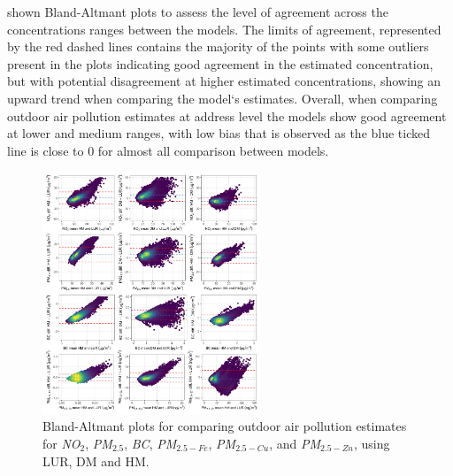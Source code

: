 \documentclass{article}
\begin{document}
\newpage

\vspace{-1em}

\textbf{} shown Bland-Altmant plots to assess the level of agreement across the concentrations ranges between the models. The limits of agreement, represented by the red dashed lines  contains the majority of the points with some outliers present in the plots indicating good agreement in the estimated concentration, but with potential disagreement at higher estimated concentrations, showing an upward trend when comparing the model`s estimates. Overall, when comparing outdoor air pollution estimates at address level the models show good agreement at lower and medium ranges, with low bias that is observed as the blue ticked line is close to 0 for almost all comparison between models. 

\captionsetup[figure]{skip=6pt}
\begin{figure}[!h]
\includegraphics[width=0.58\textwidth]{figures/final_bland_altmant.png}
\caption{Bland-Altmant plots for comparing outdoor air pollution estimates for \textit{NO$_2$}, \textit{PM$_{2.5}$}, \textit{BC}, \textit{PM$_{2.5 - Fe}$}, \textit{PM$_{2.5 - Cu}$}, and \textit{PM$_{2.5 - Zn}$}, using LUR, DM and HM.}
\label{fig6}
\end{figure}
\vspace*{-\baselineskip}
\end{document}
